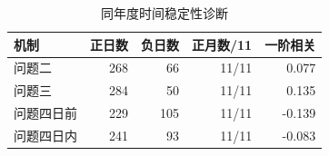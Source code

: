 \begin{table}[htbp]\centering\small
\caption{同年度时间稳定性诊断}
\begin{tabular}{lrrrr}
\toprule
机制 & 正日数 & 负日数 & 正月数/11 & 一阶相关 \\
\midrule
问题二 & 268 & 66 & 11/11 & 0.077 \\
问题三 & 284 & 50 & 11/11 & 0.135 \\
问题四日前 & 229 & 105 & 11/11 & -0.139 \\
问题四日内 & 241 & 93 & 11/11 & -0.083 \\
\bottomrule\end{tabular}\end{table}
